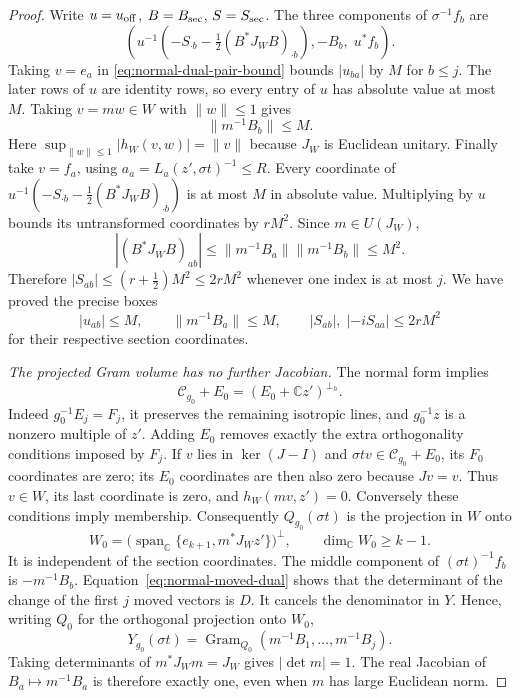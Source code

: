 \begin{proof}
Write $u=u_{\rm off}$, $B=B_{\rm sec}$, $S=S_{\rm sec}$.
The three components of $\sigma^{-1}f_b$ are
\[
 \left(u^{-1}\left(-S_{\cdot b}-\tfrac12(B^*J_WB)_{\cdot b}\right),
                      -B_b,\;u^*f_b\right).
\]
Taking $v=e_a$ in \eqref{eq:normal-dual-pair-bound} bounds
$|u_{ba}|$ by $M$ for $b\le j$.  The later rows of $u$
are identity rows, so every entry of $u$ has absolute value
at most $M$.  Taking $v=mw\in W$ with $\|w\|\le1$ gives
\[
                             \|m^{-1}B_b\|\le M.
\]
Here $\sup_{\|w\|\le1}|h_W(v,w)|=\|v\|$ because $J_W$
is Euclidean unitary.  Finally take $v=f_a$, using
$a_a=L_a(z',\sigma t)^{-1}\le R$.  Every coordinate of
$u^{-1}(-S_{\cdot b}-\tfrac12(B^*J_WB)_{\cdot b})$ is at
most $M$ in absolute value.  Multiplying by $u$ bounds its
untransformed coordinates by $rM^2$.  Since $m\in U(J_W)$,
\[
       |(B^*J_WB)_{ab}|\le\|m^{-1}B_a\|\|m^{-1}B_b\|\le M^2.
\]
Therefore $|S_{ab}|\le(r+\tfrac12)M^2\le2rM^2$ whenever
one index is at most $j$.  We have proved the precise boxes
\begin{equation}\label{eq:degenerate-coordinate-boxes}
 |u_{ab}|\le M,\qquad \|m^{-1}B_a\|\le M,\qquad
 |S_{ab}|,\;|-iS_{aa}|\le2rM^2
\end{equation}
for their respective section coordinates.

\emph{The projected Gram volume has no further Jacobian.}
The normal form implies
\[
 \mathcal C_{g_0}+E_0=(E_0+\mathbb Cz')^{\perp_h}.
\]
Indeed $g_0^{-1}E_j=F_j$, it preserves the remaining
isotropic lines, and $g_0^{-1}z$ is a nonzero multiple of
$z'$.  Adding $E_0$ removes exactly the extra orthogonality
conditions imposed by $F_j$.
If $v$ lies in $\ker(J-I)$ and
$\sigma tv\in\mathcal C_{g_0}+E_0$, its $F_0$ coordinates
are zero; its $E_0$ coordinates are then also zero because
$Jv=v$.  Thus $v\in W$, its last coordinate is zero, and
$h_W(mv,z')=0$.  Conversely these conditions imply membership.
Consequently $Q_{g_0}(\sigma t)$ is the projection in $W$ onto
\[
       W_0=\bigl(\operatorname{span}_{\mathbb C}
             \{e_{k+1},m^*J_Wz'\}\bigr)^\perp,
          \qquad \dim_{\mathbb C}W_0\ge k-1.
\]
It is independent of the section coordinates.  The middle
component of $(\sigma t)^{-1}f_b$ is $-m^{-1}B_b$.
Equation~\eqref{eq:normal-moved-dual} shows that the
determinant of the change of the first $j$ moved vectors is
$D$.  It cancels the denominator in $Y$.  Hence, writing
$Q_0$ for the orthogonal projection onto $W_0$,
\begin{equation}\label{eq:actual-degenerate-gram-coordinate}
       Y_{g_0}(\sigma t)=
              \operatorname{Gram}_{Q_0}(m^{-1}B_1,\ldots,m^{-1}B_j).
\end{equation}
Taking determinants of $m^*J_Wm=J_W$ gives $|\det m|=1$.
The real Jacobian of $B_a\mapsto m^{-1}B_a$ is therefore
exactly one, even when $m$ has large Euclidean norm.


\end{proof}
